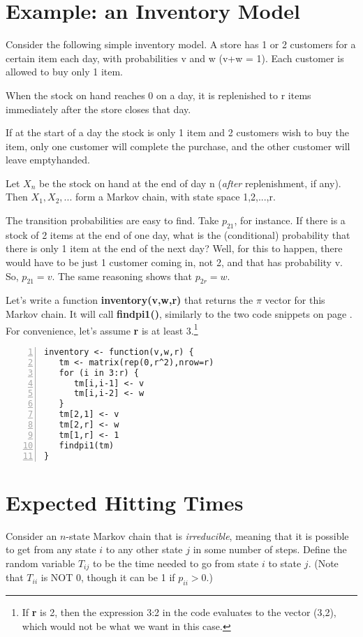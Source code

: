 \section{Example: an Inventory Model}

Consider the following simple inventory model.  A store
has 1 or 2 customers for a certain item each day, with probabilities v
and w (v+w = 1).  Each customer is allowed to buy only 1 item.

When the stock on hand reaches 0 on a day, it is replenished to r
items immediately after the store closes that day.

If at the start of a day the stock is only 1 item and 2 customers wish
to buy the item, only one customer will complete the purchase, and the
other customer will leave emptyhanded.

Let $X_n$ be the stock on hand at the end of day n ({\it after}
replenishment, if any).  Then $X_1, X_2,...$ form a Markov chain, with
state space 1,2,...,r.

The transition probabilities are easy to find.  Take $p_{21}$, for
instance.  If there is a stock of 2 items at the end of one day, what
is the (conditional) probability that there is only 1 item at the end of
the next day?  Well, for this to happen, there would have to be just 1
customer coming in, not 2, and that has probability v.  So, $p_{21} =
v$.  The same reasoning shows that $p_{2r} = w$.

Let's write a function {\bf inventory(v,w,r)} that returns the
$\pi$ vector for this Markov chain.  It will call {\bf findpi1()},
similarly to the two code snippets on page \pageref{codesnippets}.
For convenience, let's assume {\bf r} is at least 3.\footnote{If {\bf
r} is 2, then the expression 3:2 in the code evaluates to the vector
(3,2), which would not be what we want in this case.}

\begin{lstlisting}[numbers=left]
inventory <- function(v,w,r) {
   tm <- matrix(rep(0,r^2),nrow=r)
   for (i in 3:r) {
      tm[i,i-1] <- v
      tm[i,i-2] <- w
   }
   tm[2,1] <- v
   tm[2,r] <- w
   tm[1,r] <- 1
   findpi1(tm)
}
\end{lstlisting}

\section{Expected Hitting Times}

Consider an $n$-state Markov chain that is {\it irreducible},
meaning that it is possible to get from any state $i$ to any other state
$j$ in some number of steps.  Define the random variable $T_{ij}$ to be
the time needed to go from state $i$ to state $j$.  (Note that $T_{ii}$
is NOT 0, though it can be 1 if $p_{ii} > 0$.)

